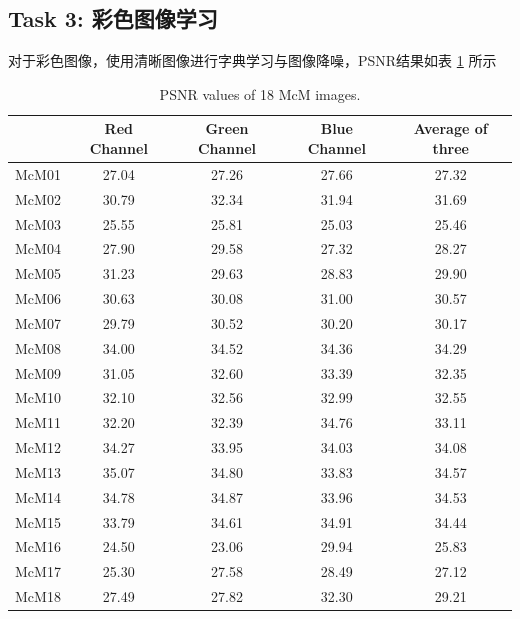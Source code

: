 \documentclass[a4paper,11pt]{article}
\begin{document}

%
%

\subsection{Task 3: 彩色图像学习}

对于彩色图像，使用清晰图像进行字典学习与图像降噪，PSNR结果如表 \ref{tab:result_task3} 所示

\begin{table}[H]
	\centering
	\caption{PSNR values of 18 McM images.}
	\label{tab:result_task3}
	\begin{tabular}{|c|c|c|c|c|}
		\hline
		 & Red Channel & Green Channel & Blue Channel & Average of three \\ \hline
		McM01 & 27.04  & 27.26  & 27.66  & 27.32  \\ \hline
		McM02 & 30.79  & 32.34  & 31.94  & 31.69  \\ \hline
		McM03 & 25.55  & 25.81  & 25.03  & 25.46  \\ \hline
		McM04 & 27.90  & 29.58  & 27.32  & 28.27  \\ \hline
		McM05 & 31.23  & 29.63  & 28.83  & 29.90  \\ \hline
		McM06 & 30.63  & 30.08  & 31.00  & 30.57  \\ \hline
		McM07 & 29.79  & 30.52  & 30.20  & 30.17  \\ \hline
		McM08 & 34.00  & 34.52  & 34.36  & 34.29  \\ \hline
		McM09 & 31.05  & 32.60  & 33.39  & 32.35  \\ \hline
		McM10 & 32.10  & 32.56  & 32.99  & 32.55  \\ \hline
		McM11 & 32.20  & 32.39  & 34.76  & 33.11  \\ \hline
		McM12 & 34.27  & 33.95  & 34.03  & 34.08  \\ \hline
		McM13 & 35.07  & 34.80  & 33.83  & 34.57  \\ \hline
		McM14 & 34.78  & 34.87  & 33.96  & 34.53  \\ \hline
		McM15 & 33.79  & 34.61  & 34.91  & 34.44  \\ \hline
		McM16 & 24.50  & 23.06  & 29.94  & 25.83  \\ \hline
		McM17 & 25.30  & 27.58  & 28.49  & 27.12  \\ \hline
		McM18 & 27.49  & 27.82  & 32.30  & 29.21  \\ \hline
	\end{tabular}
\end{table}
\end{document}
